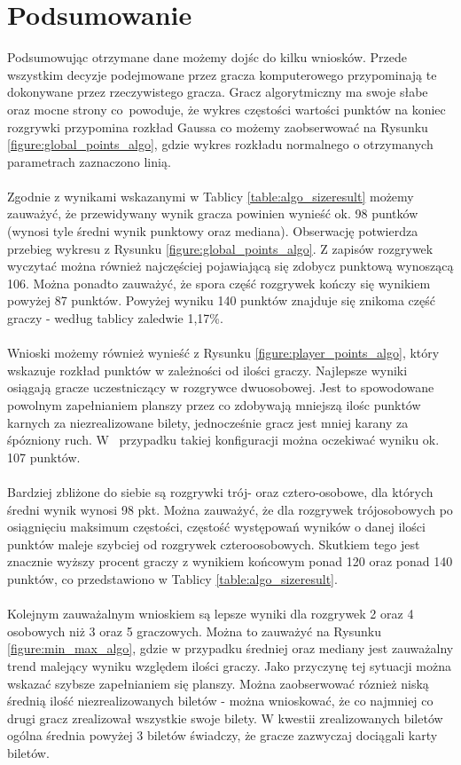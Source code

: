 \documentclass[12pt, oneside]{report}
\begin{document}
	\section{Podsumowanie} 
	Podsumowując otrzymane dane możemy dojśc do kilku wniosków. Przede wszystkim decyzje podejmowane przez gracza komputerowego przypominają te dokonywane przez rzeczywistego gracza. Gracz algorytmiczny ma swoje słabe oraz mocne strony co~powoduje, że wykres częstości wartości punktów na koniec rozgrywki przypomina rozkład Gaussa co możemy zaobserwować na Rysunku \ref{figure:global_points_algo}, gdzie wykres rozkładu normalnego o otrzymanych parametrach zaznaczono linią. \\ \\
	Zgodnie z wynikami wskazanymi w Tablicy \ref{table:algo_sizeresult} możemy zauważyć, że przewidywany wynik gracza powinien wynieść ok. 98 puntków (wynosi tyle średni wynik punktowy oraz mediana). Obserwację potwierdza przebieg wykresu z Rysunku \ref{figure:global_points_algo}. Z zapisów rozgrywek wyczytać można również najczęściej pojawiającą się zdobycz punktową wynoszącą 106. Można  ponadto zauważyć, że spora część rozgrywek kończy się wynikiem powyżej 87 punktów. Powyżej wyniku 140 punktów znajduje się znikoma część graczy - według tablicy zaledwie 1,17\%. \\ \\ 
	Wnioski możemy również wynieść z Rysunku \ref{figure:player_points_algo}, który wskazuje rozkład punktów w zależności od ilości graczy. Najlepsze wyniki osiągają gracze uczestniczący w rozgrywce dwuosobowej. Jest to spowodowane powolnym zapełnianiem planszy przez co zdobywają mniejszą ilośc punktów karnych za niezrealizowane bilety, jednocześnie gracz jest mniej karany za śpózniony ruch. W~ przypadku takiej konfiguracji można oczekiwać wyniku ok. 107 punktów. \\ \\ 
	Bardziej zbliżone do siebie są rozgrywki trój- oraz cztero-osobowe, dla których średni wynik wynosi 98 pkt. Można zauważyć, że dla rozgrywek trójosobowych po osiągnięciu maksimum częstości, częstość występowań wyników o danej ilości punktów maleje szybciej od rozgrywek czteroosobowych. Skutkiem tego jest znacznie wyższy procent graczy z wynikiem końcowym ponad 120 oraz ponad 140 punktów, co przedstawiono w Tablicy \ref{table:algo_sizeresult}. \\ \\
	Kolejnym zauważalnym wnioskiem są lepsze wyniki dla rozgrywek 2 oraz 4 osobowych niż 3 oraz 5 graczowych. Można to zauważyć na Rysunku \ref{figure:min_max_algo}, gdzie w przypadku średniej oraz mediany jest zauważalny trend malejący wyniku względem ilości graczy. Jako przyczynę tej sytuacji można wskazać szybsze zapełnianiem się planszy. Można zaobserwować róznież niską średnią ilość niezrealizowanych biletów - można wnioskować, że co najmniej co drugi gracz zrealizował wszystkie swoje bilety. W kwestii zrealizowanych biletów ogólna średnia powyżej 3 biletów świadczy, że gracze zazwyczaj dociągali karty biletów. \\ \\
\end{document}
